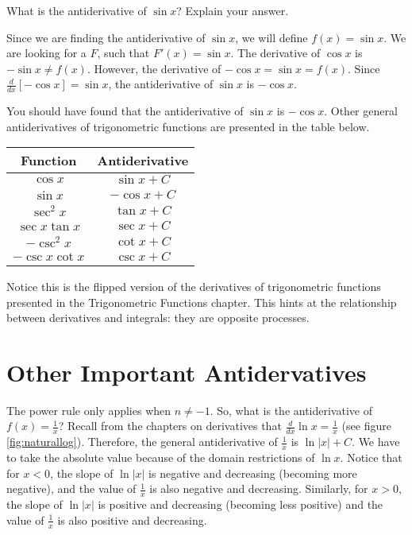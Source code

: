 \begin{Exercise}[label=triganti]
What is the antiderivative of $\sin{x}$? Explain your answer. 
\end{Exercise}

\begin{Answer}[ref=triganti]
Since we are finding the antiderivative of $\sin{x}$, we will define 
$f(x) = \sin{x}$. We are looking for a $F$, such that $F'(x) = \sin{x}$. 
The derivative of $\cos{x}$ is $-\sin{x} \neq f(x)$. However, the derivative 
of $-\cos{x} = \sin{x} = f(x)$. Since $\frac{d}{dx} [-\cos{x}] = 
\sin{x}$, the antiderivative of $\sin{x}$ is $-\cos{x}$. 
\end{Answer}

You should have found that the antiderivative of $\sin{x}$ is 
$-\cos{x}$. Other general antiderivatives of trigonometric functions 
are presented in the table below. 

\begin{center}
	\begin{tabular}{|c|c|}\hline
		Function & Antiderivative\\
		\hline
		$\cos{x}$ & $\sin{x} + C$\\
		\hline
		$\sin{x}$ & $-\cos{x} + C$\\
		\hline
		$\sec^2{x}$ & $\tan{x} + C$\\
		\hline
		$\sec{x} \tan{x}$ & $\sec{x} + C$\\
		\hline
		$-\csc^2{x}$ & $\cot{x} + C$\\
		\hline
		$-\csc{x} \cot{x}$ & $\csc{x} + C$\\
		\hline
	\end{tabular}
\end{center}


Notice this is the flipped version of the derivatives of trigonometric 
functions presented in the Trigonometric Functions chapter. This hints 
at the relationship between derivatives and integrals: they are 
opposite processes. 

\section{Other Important Antidervatives}
The power rule only applies when $n\neq-1$. So, what is the 
antiderivative of $f(x) = \frac{1}{x}$? Recall from the chapters on 
derivatives that $\frac{d}{dx} \ln{x} = \frac{1}{x}$ (see figure 
\ref{fig:naturallog}). Therefore, the general antiderivative of 
$\frac{1}{x}$ is $\ln{|x|} + C$. We have to take the absolute value 
because of the domain restrictions of $\ln{x}$. Notice that for $x<0$, 
the slope of $\ln{|x|}$ is negative and decreasing (becoming more 
negative), and the value of $\frac{1}{x}$ is also negative and 
decreasing. Similarly, for $x>0$, the slope of $\ln{|x|}$ is positive 
and decreasing (becoming less positive) and the value of $\frac{1}{x}$ 
is also positive and decreasing. 

